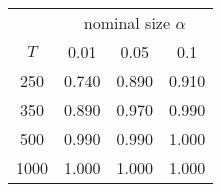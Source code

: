 % 
\begin{tabular}{cccc}
  \hline
  & \multicolumn{3}{c}{nominal size $\alpha$} \\
 $T$ & 0.01 & 0.05 & 0.1 \\
 \hline
250 & 0.740 & 0.890 & 0.910 \\ 
  350 & 0.890 & 0.970 & 0.990 \\ 
  500 & 0.990 & 0.990 & 1.000 \\ 
  1000 & 1.000 & 1.000 & 1.000 \\ 
   \hline
\end{tabular}
